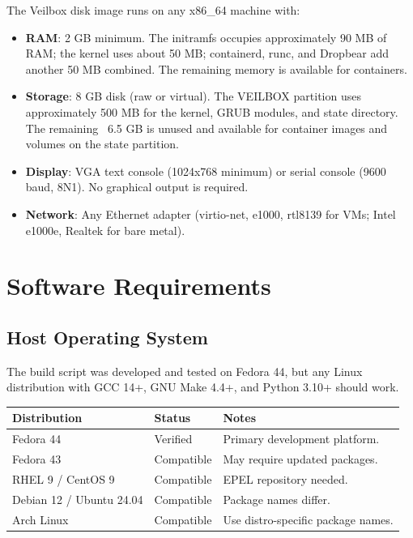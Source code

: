 The Veilbox disk image runs on any x86\_64 machine with:

\begin{itemize}[nosep]
  \item \textbf{RAM}: 2 GB minimum. The initramfs occupies approximately
        90 MB of RAM; the kernel uses about 50 MB; containerd, runc, and
        Dropbear add another 50 MB combined. The remaining memory is
        available for containers.
  \item \textbf{Storage}: 8 GB disk (raw or virtual). The VEILBOX partition
        uses approximately 500 MB for the kernel, GRUB modules, and state
        directory. The remaining ~6.5 GB is unused and available for
        container images and volumes on the state partition.
  \item \textbf{Display}: VGA text console (1024x768 minimum) or serial
        console (9600 baud, 8N1). No graphical output is required.
  \item \textbf{Network}: Any Ethernet adapter (virtio-net, e1000, rtl8139
        for VMs; Intel e1000e, Realtek for bare metal).
\end{itemize}

\section{Software Requirements}

\subsection{Host Operating System}

The build script was developed and tested on Fedora 44, but any Linux
distribution with GCC 14+, GNU Make 4.4+, and Python 3.10+ should work.

\begin{longtable}{|p{4cm}|p{4cm}|p{4cm}|}
\hline
\textbf{Distribution} & \textbf{Status} & \textbf{Notes} \\
\hline
Fedora 44 & Verified & Primary development platform. \\
Fedora 43 & Compatible & May require updated packages. \\
RHEL 9 / CentOS 9 & Compatible & EPEL repository needed. \\
Debian 12 / Ubuntu 24.04 & Compatible & Package names differ. \\
Arch Linux & Compatible & Use distro-specific package names. \\
\hline
\end{longtable}

